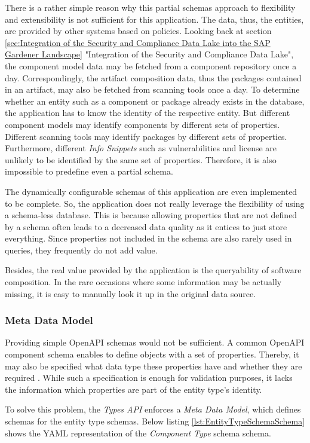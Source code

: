 There is a rather simple reason why this partial schemas approach to flexibility and extensibility is not sufficient for this application. The data, thus, the entities, are provided by other systems based on policies. Looking back at section \ref{sec:Integration of the Security and Compliance Data Lake into the SAP Gardener Landscape} "Integration of the Security and Compliance Data Lake", the component model data may be fetched from a component repository once a day. Correspondingly, the artifact composition data, thus the packages contained in an artifact, may also be fetched from scanning tools once a day. To determine whether an entity such as a component or package already exists in the database, the application has to know the identity of the respective entity. But different component models may identify components by different sets of properties. Different scanning tools may identify packages by different sets of properties. Furthermore, different \emph{Info Snippets} such as vulnerabilities and license are unlikely to be identified by the same set of properties. Therefore, it is also impossible to predefine even a partial schema.\par 
The dynamically configurable schemas of this application are even implemented to be complete. So, the application does not really leverage the flexibility of using a schema-less database. This is because allowing properties that are not defined by a schema often leads to a decreased data quality as it entices to just store everything. Since properties not included in the schema are also rarely used in queries, they frequently do not add value.\par 
Besides, the real value provided by the application is the queryability of software composition. In the rare occasions where some information may be actually missing, it is easy to manually look it up in the original data source.  


\subsubsection{Meta Data Model} \label{sec:Meta Data Model}
Providing simple OpenAPI schemas would not be sufficient. A common OpenAPI component schema enables to define objects with a set of properties. Thereby, it may also be specified what data type these properties have and whether they are required \cite{OpenAPISpec}. While such a specification is enough for validation purposes, it lacks the information which properties are part of the entity type's identity.\par 
To solve this problem, the \emph{Types API} enforces a \emph{Meta Data Model}, which defines schemas for the entity type schemas. Below listing \ref{lst:EntityTypeSchemaSchema} shows the YAML representation of the \emph{Component Type} schema schema.

